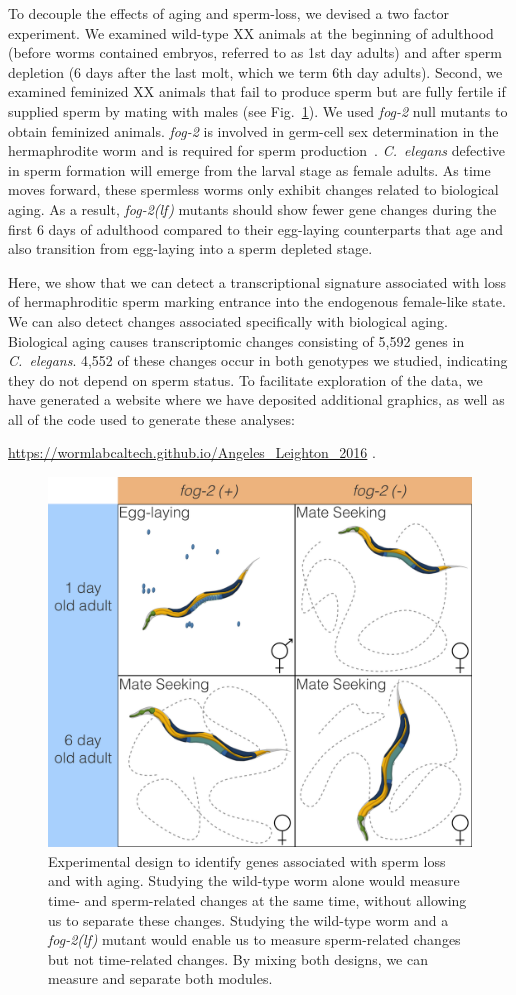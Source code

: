 \documentclass[9pt,twocolumn,twoside]{gsag3jnl}
\newcommand{\cel}{\emph{C.~elegans}}
\newcommand{\fog}{\emph{\mbox{fog-2(lf)}}}
\newcommand{\gene}[1]{\emph{\mbox{#1}}}
\newcommand{\agen}{5,592}
\newcommand{\website}{
            \url{https://wormlabcaltech.github.io/Angeles_Leighton_2016}
            }
\begin{document}
To decouple the effects of aging and sperm-loss, we devised a two factor
experiment. We examined wild-type XX animals at the beginning of adulthood
(before worms contained embryos, referred to as 1st day adults) and after sperm
depletion (6 days after the last molt, which we term 6th day adults). Second, we
examined feminized XX animals that fail to produce sperm but are fully fertile
if supplied sperm by mating with males (see Fig.~\ref{fig:wormlife}). We used
\gene{fog-2} null mutants to obtain feminized animals. \gene{fog-2} is involved in
germ-cell sex determination in the hermaphrodite worm and is required for sperm
production~\citep{Schedl1988,Clifford2000}. \cel{} defective in sperm formation
will emerge from the larval stage as female adults. As time moves forward, these
spermless worms only exhibit changes related to biological aging. As a result,
\fog{} mutants should show fewer gene changes during the first 6 days of
adulthood compared to their egg-laying counterparts that age and also transition
from egg-laying into a sperm depleted stage.

Here, we show that we can detect a transcriptional signature associated
with loss of hermaphroditic sperm marking entrance into the endogenous
female-like state. We can also detect changes associated specifically with
biological aging. Biological aging causes transcriptomic changes consisting of
\agen{} genes in \cel{}. 4,552 of these changes occur in both genotypes we
studied, indicating they do not depend on sperm status. To facilitate
exploration of the data, we have generated a website where we have deposited
additional graphics, as well as all of the code used to generate these analyses:
\website{}.

\begin{figure}[htbp]
  \renewcommand{\familydefault}{\sfdefault}\normalfont{}
  \centering
  \captionsetup{width=\linewidth}
  \includegraphics[width=0.6\linewidth]{../../output/figs/final_figs/worm_life_fog2_vs_n2.pdf}
    \caption{
    Experimental design to identify genes associated with sperm loss and with
    aging. Studying the wild-type worm alone would measure time- and
    sperm-related changes at the same time, without allowing us to separate
    these changes. Studying the wild-type worm and a \fog{} mutant would enable
    us to measure sperm-related changes but not time-related changes. By mixing
    both designs, we can measure and separate both modules.
  }%
\label{fig:wormlife}
\end{figure}
\end{document}
